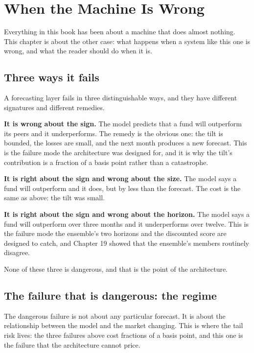 
\chapter{When the Machine Is Wrong}
\label{ch:wrong}

Everything in this book has been about a machine that does almost nothing.
This chapter is about the other case: what happens when a system like this
one is wrong, and what the reader should do when it is.

\section{Three ways it fails}

A forecasting layer fails in three distinguishable ways, and they have
different signatures and different remedies.

\textbf{It is wrong about the sign.} The model predicts that a fund will
outperform its peers and it underperforms. The remedy is the obvious one:
the tilt is bounded, the losses are small, and the next month produces a
new forecast. This is the failure mode the architecture was designed for,
and it is why the tilt's contribution is a fraction of a basis point
rather than a catastrophe.

\textbf{It is right about the sign and wrong about the size.} The model
says a fund will outperform and it does, but by less than the forecast.
The cost is the same as above: the tilt was small.

\textbf{It is right about the sign and wrong about the horizon.} The model
says a fund will outperform over three months and it underperforms over
twelve. This is the failure mode the ensemble's two horizons and the
discounted score are designed to catch, and Chapter 19 showed that the
ensemble's members routinely disagree.

None of these three is dangerous, and that is the point of the
architecture.

\section{The failure that is dangerous: the regime}

The dangerous failure is not about any particular forecast. It is about
the relationship between the model and the market changing. This is where
the tail risk lives: the three failures above cost fractions of a basis
point, and this one is the failure that the architecture cannot price.

